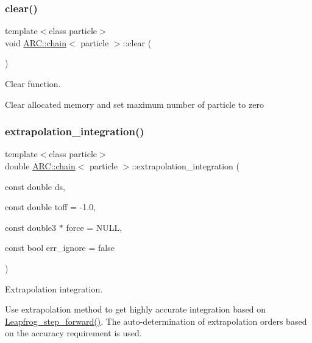\subsubsection{\texorpdfstring{clear()}{clear()}}
{\footnotesize\ttfamily template$<$class particle$>$ \\
void \hyperlink{classARC_1_1chain}{A\+R\+C\+::chain}$<$ particle $>$\+::clear (\begin{DoxyParamCaption}{ }\end{DoxyParamCaption})\hspace{0.3cm}{\ttfamily [inline]}}



Clear function. 

Clear allocated memory and set maximum number of particle to zero \hypertarget{classARC_1_1chain_a0eb7768cb1b9099bbf66124d4c00164c}{}\label{classARC_1_1chain_a0eb7768cb1b9099bbf66124d4c00164c} 
\subsubsection{\texorpdfstring{extrapolation\+\_\+integration()}{extrapolation\_integration()}}
{\footnotesize\ttfamily template$<$class particle$>$ \\
double \hyperlink{classARC_1_1chain}{A\+R\+C\+::chain}$<$ particle $>$\+::extrapolation\+\_\+integration (\begin{DoxyParamCaption}\item[{const double}]{ds,  }\item[{const double}]{toff = {\ttfamily -\/1.0},  }\item[{const double3 $\ast$}]{force = {\ttfamily NULL},  }\item[{const bool}]{err\+\_\+ignore = {\ttfamily false} }\end{DoxyParamCaption})\hspace{0.3cm}{\ttfamily [inline]}}



Extrapolation integration. 

Use extrapolation method to get highly accurate integration based on \hyperlink{classARC_1_1chain_a82b26731761231d86fd2e0b4529df6fa}{Leapfrog\+\_\+step\+\_\+forward()}. The auto-\/determination of extrapolation orders based on the accuracy requirement is used.


